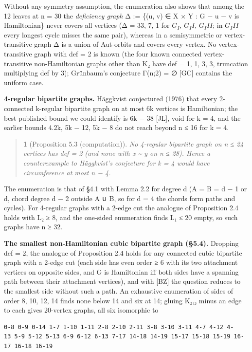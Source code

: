\documentclass[11pt,a4paper]{article}
\theoremstyle{named}
\newtheorem*{namedthm}{}
\begin{document}
Without any symmetry assumption, the enumeration also shows that among the 12 leaves at n = 30 the \textit{deficiency graph} Δ := \{(u, v) ∈ X × Y : G − u − v is Hamiltonian\} never covers all vertices (\textbar{}Δ\textbar{} = 33, 7, 1 for $G_I$, $G_II$, $G_III$; in $G_III$ every longest cycle misses the same pair), whereas in a semisymmetric or vertex-transitive graph Δ is a union of Aut-orbits and covers every vertex. No vertex-transitive graph with def = 2 is known (the four known connected vertex-transitive non-Hamiltonian graphs other than K₂ have def = 1, 1, 3, 3, truncation multiplying def by 3); Grünbaum's conjecture Γ(n;2) = ∅ [GC] contains the uniform case.

\textbf{4-regular bipartite graphs.} Häggkvist conjectured (1976) that every 2-connected k-regular bipartite graph on at most 6k vertices is Hamiltonian; the best published bound we could identify is 6k − 38 [JL], void for k = 4, and the earlier bounds 4.2k, 5k − 12, 5k − 8 do not reach beyond n ≤ 16 for k = 4.

\begin{quote}
\begin{namedthm}[Proposition 5.3 (computation)]
No 4-regular bipartite graph on n ≤ 24 vertices has def = 2 (and none with x \textasciitilde{} y on n ≤ 28). Hence a counterexample to Häggkvist's conjecture for k = 4 would have circumference at most n − 4.
\end{namedthm}
\end{quote}
The enumeration is that of §4.1 with Lemma 2.2 for degree d (\textbar{}A\textbar{} = \textbar{}B\textbar{} = d − 1 or d, chord degree d − 2 outside A ∪ B, so for d = 4 the chords form paths and cycles). For 4-regular graphs with a 2-edge cut the analogue of Proposition 2.4 holds with L₂ ≥ 8, and the one-sided enumeration finds L₁ ≤ 20 empty, so such graphs have n ≥ 32.

\textbf{The smallest non-Hamiltonian cubic bipartite graph (§5.4).} Dropping def = 2, the analogue of Proposition 2.4 holds for any connected cubic bipartite graph with a 2-edge cut (each side has even order ≥ 6 with its two attachment vertices on opposite sides, and G is Hamiltonian iff both sides have a spanning path between their attachment vertices), and with [BZ] the question reduces to the smallest side without such a path. An exhaustive enumeration of sides of order 8, 10, 12, 14 finds none below 14 and six at 14; gluing K₃,₃ minus an edge to each gives 20-vertex graphs, all six isomorphic to

\texttt{0-8\ \allowbreak{}0-9\ \allowbreak{}0-14\ \allowbreak{}1-7\ \allowbreak{}1-10\ \allowbreak{}1-11\ \allowbreak{}2-8\ \allowbreak{}2-10\ \allowbreak{}2-11\ \allowbreak{}3-8\ \allowbreak{}3-10\ \allowbreak{}3-11\ \allowbreak{}4-7\ \allowbreak{}4-12\ \allowbreak{}4-13\ \allowbreak{}5-9\ \allowbreak{}5-12\ \allowbreak{}5-13\ \allowbreak{}6-9\ \allowbreak{}6-12\ \allowbreak{}6-13\ \allowbreak{}7-17\ \allowbreak{}14-18\ \allowbreak{}14-19\ \allowbreak{}15-17\ \allowbreak{}15-18\ \allowbreak{}15-19\ \allowbreak{}16-17\ \allowbreak{}16-18\ \allowbreak{}16-19}
\end{document}

